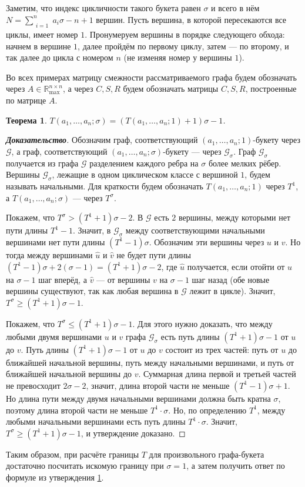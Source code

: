 \documentclass[12pt]{article}
\newtheorem{theorem}{Теорема}[section]
\begin{document}
Заметим, что индекс цикличности такого букета равен $\sigma$ и всего в нём $N = \sum\limits_{\substack{i=1}}^n a_i\sigma - n + 1$ вершин. Пусть вершина, в которой пересекаются все циклы, имеет номер $1$. Пронумеруем вершины в порядке следующего обхода: начнем в вершине $1$, далее пройдём по первому циклу, затем --- по второму, и так далее до цикла с номером $n$ (не изменяя номер у вершины $1$).

Во всех примерах матрицу смежности рассматриваемого графа будем обозначать через $A \in \mathbb{R}_{\max}^{n \times n}$, а через $C, S, R$ будем обозначать матрицы $C, S, R$, построенные по матрице $A$.

\begin{theorem}
\label{everyKFormula}
$T(a_1, \dots, a_n; \sigma) = (T(a_1, \dots, a_n; 1) + 1)\sigma - 1$.
\end{theorem}
\begin{proof}[\textbf{Доказательство}] 
Обозначим граф, соответствующий $(a_1, \dots, a_n; 1)$-букету через $\mathcal{G}$, а граф, соответствующий $(a_1, \dots, a_n; \sigma)$-букету --- через $\mathcal{G}_\sigma$. Граф $\mathcal{G}_\sigma$ получается из графа $\mathcal{G}$ разделением каждого ребра на $\sigma$ более мелких рёбер. Вершины $\mathcal{G}_\sigma$, лежащие в одном циклическом классе с вершиной $1$, будем называть начальными. Для краткости будем обозначать $T(a_1, \dots, a_n; 1)$ через $T^1$, а $T(a_1, \dots, a_n; \sigma)$ --- через $T^{\sigma}$.

Покажем, что $T^{\sigma} > (T^1 + 1)\sigma - 2$. В $\mathcal{G}$ есть $2$ вершины, между которыми нет пути длины $T^1 - 1$. Значит, в $\mathcal{G}_\sigma$ между соответствующими начальными вершинами нет пути длины $(T^1 - 1)\sigma$. Обозначим эти вершины через $u$ и $v$. Но тогда между вершинами $\hat{u}$ и $\hat{v}$ не будет пути длины $(T^1 - 1)\sigma + 2(\sigma - 1) = (T^1 + 1)\sigma - 2$, где $\hat{u}$ получается, если отойти от $u$ на $\sigma - 1$  шаг вперёд, а $\hat{v}$ --- от вершины $v$ на $\sigma - 1$ шаг назад (обе новые вершины существуют, так как любая вершина в $\mathcal{G}$ лежит в цикле). Значит, $T^{\sigma} \ge (T^1 + 1)\sigma - 1$.

Покажем, что $T^{\sigma} \le (T^1 + 1)\sigma - 1$. Для этого нужно доказать, что между любыми двумя вершинами $u$ и $v$ графа $\mathcal{G}_\sigma$ есть путь длины $(T^1 + 1)\sigma - 1$ от $u$ до $v$. Путь длины $(T^1 + 1)\sigma - 1$ от $u$ до $v$ состоит из трех частей: путь от $u$ до ближайшей начальной вершины, путь между начальными вершинами, и путь от ближайшей начальной вершины до $v$. Суммарная длина первой и третьей частей не превосходит $2\sigma - 2$, значит, длина второй части не меньше $(T^1 - 1)\sigma + 1$. Но длина пути между двумя начальными вершинами должна быть кратна $\sigma$, поэтому длина второй части не меньше $T^1\cdot \sigma$. Но, по определению $T^1$, между любыми начальными вершинами есть путь длины $T^1\cdot \sigma$. Значит, $T^{\sigma} \ge (T^1 + 1)\sigma - 1$, и утверждение доказано.
\end{proof}
Таким образом, при расчёте границы $T$ для произвольного графа-букета достаточно посчитать искомую границу при $\sigma = 1$, а затем получить ответ по формуле из утверждения \ref{everyKFormula}. 
\end{document}
